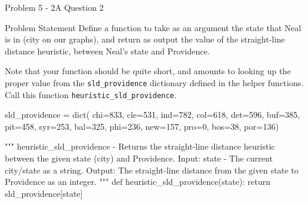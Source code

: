 \begin{problem}{Problem 5 - 2A Question 2}
    \begin{statement}{Problem Statement}
        Define a function to take as an argument the state that Neal is in (city on our graphs), and return as output the value of the straight-line distance heuristic, between Neal's state and Providence.

        Note that your function should be quite short, and amounts to looking up the proper value from the \texttt{sld\_providence} dictionary defined in the helper functions. Call this function \texttt{heuristic\_sld\_providence}.
    \end{statement}

    \begin{highlight}[Solution]
    \begin{code}[Python]
    sld_providence = dict(
        chi=833,
        cle=531,
        ind=782,
        col=618,
        det=596,
        buf=385,
        pit=458,
        syr=253,
        bal=325,
        phi=236,
        new=157,
        pro=0,
        bos=38,
        por=136)
    
    """ heuristic_sld_providence - Returns the straight-line distance heuristic between the given state (city) and Providence.
        Input:
            state - The current city/state as a string.
        Output:
            The straight-line distance from the given state to Providence as an integer.
    """
    def heuristic_sld_providence(state):
        return sld_providence[state]
    \end{code}
    \end{highlight}
\end{problem}

